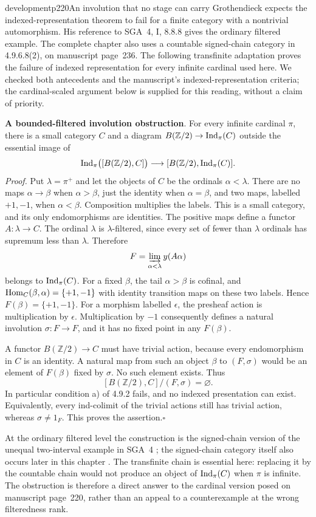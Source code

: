 \begin{dcomment}{development}{p220}{An involution that no stage can carry}
Grothendieck expects the indexed-representation theorem to fail for a finite category with a nontrivial automorphism. His reference to SGA~4, I, 8.8.8 gives the ordinary filtered example. The complete chapter also uses a countable signed-chain category in 4.9.6.8(2), on manuscript page~236. The following transfinite adaptation proves the failure of indexed representation for every infinite cardinal used here. We checked both antecedents and the manuscript's indexed-representation criteria; the cardinal-scaled argument below is supplied for this reading, without a claim of priority.

\textbf{A bounded-filtered involution obstruction}\ours.
For every infinite cardinal $\pi$, there is a small category $C$ and a diagram $B(\mathbb Z/2)\to\operatorname{Ind}_\pi(C)$ outside the essential image of
\[
 \operatorname{Ind}_\pi\bigl([B(\mathbb Z/2),C]\bigr)
 \longrightarrow[B(\mathbb Z/2),\operatorname{Ind}_\pi(C)].
\]
\textit{Proof.} Put $\lambda=\pi^+$ and let the objects of $C$ be the ordinals $\alpha<\lambda$. There are no maps $\alpha\to\beta$ when $\alpha>\beta$, just the identity when $\alpha=\beta$, and two maps, labelled $+1,-1$, when $\alpha<\beta$. Composition multiplies the labels. This is a small category, and its only endomorphisms are identities. The positive maps define a functor $A:\lambda\to C$. The ordinal $\lambda$ is $\lambda$-filtered, since every set of fewer than $\lambda$ ordinals has supremum less than $\lambda$. Therefore
\[
 F=\varinjlim_{\alpha<\lambda}y(A\alpha)
\]
belongs to $\operatorname{Ind}_\pi(C)$. For a fixed $\beta$, the tail $\alpha>\beta$ is cofinal, and $\operatorname{Hom}_C(\beta,\alpha)=\{+1,-1\}$ with identity transition maps on these two labels. Hence $F(\beta)=\{+1,-1\}$. For a morphism labelled $\epsilon$, the presheaf action is multiplication by $\epsilon$. Multiplication by $-1$ consequently defines a natural involution $\sigma:F\to F$, and it has no fixed point in any $F(\beta)$.

A functor $B(\mathbb Z/2)\to C$ must have trivial action, because every endomorphism in $C$ is an identity. A natural map from such an object $\beta$ to $(F,\sigma)$ would be an element of $F(\beta)$ fixed by $\sigma$. No such element exists. Thus
\[
 [B(\mathbb Z/2),C]/(F,\sigma)=\varnothing.
\]
In particular condition a) of 4.9.2 fails, and no indexed presentation can exist. Equivalently, every ind-colimit of the trivial actions still has trivial action, whereas $\sigma\neq1_F$. This proves the assertion.\hfill$\square$

At the ordinary filtered level the construction is the signed-chain version of the unequal two-interval example in SGA~4 \citep[I, Exercise~8.8.8]{SGA4I1972}; the signed-chain category itself also occurs later in this chapter \citep[4.9.6.8(2)]{Grothendieck1990XVIII}. The transfinite chain is essential here: replacing it by the countable chain would not produce an object of $\operatorname{Ind}_\pi(C)$ when $\pi$ is infinite. The obstruction is therefore a direct answer to the cardinal version posed on manuscript page~220, rather than an appeal to a counterexample at the wrong filteredness rank.
\end{dcomment}


